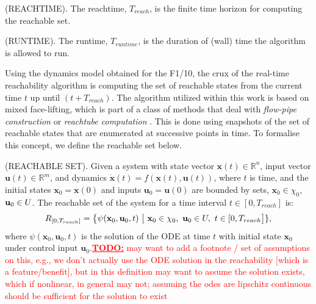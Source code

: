 \documentclass[manuscript,screen,review]{acmart}
\newcommand{\todo}[1]{\textcolor{red}{\textbf{\underline{TODO:}} #1}}
\begin{document}
\begin{definition}%
(REACHTIME). The reachtime, $T_{reach}$, is the finite time horizon for computing the reachable set.
\end{definition}%
\begin{definition}%
(RUNTIME). The runtime, $T_{runtime}$, is the duration of (wall) time the algorithm is allowed to run.
\end{definition}%
 Using the dynamics model obtained for the F1/10, the crux of the real-time reachability algorithm is computing the set of reachable states from the current time $t$ up until $(t+T_{reach})$. The algorithm utilized within this work is based on mixed face-lifting, which is part of a class of methods that deal with \textit{flow-pipe construction} or \textit{reachtube computation} \cite{Johnson2016}. This is done using snapshots of the set of reachable states that are enumerated at successive points in time. To formalise this concept, we define the reachable set below.
\smallskip
\begin{definition}%
(REACHABLE SET). Given a system with state vector $\textbf{x}(t) \in \mathbb{R}^n$, input vector $\textbf{u}(t) \in \mathbb{R}^m$, and dynamics $\dot{\textbf{x}}(t)=f(\textbf{x}(t),\textbf{u}(t))$, where $t$ is time, and the initial states $\textbf{x}_0 = \textbf{x}(0)$ and inputs $\textbf{u}_0 = \textbf{u}(0)$ are bounded by sets, $\textbf{x}_0 \in \chi_0$, $\textbf{u}_0 \in \mathnormal{U}$. The reachable set of the system for a time interval $ t \in [0,T_{reach}]$ is:%
%
\begin{equation*}%
    \mathnormal{R}_{[0,T_{reach}]} = \big \{ \psi(\textbf{x}_0,\textbf{u}_0,t) \ \big| \ \textbf{x}_0 \in \chi_0, \ \textbf{u}_0 \in \mathnormal{U}, \ t \in [0,T_{reach}\big]\},%
\end{equation*}%
%
\noindent where $\psi(\textbf{x}_0,\textbf{u}_0,t)$ is the solution of the ODE at time $t$ with initial state $\textbf{x}_0$ under control input $\textbf{u}_0$.\todo{may want to add a footnote / set of assumptions on this, e.g., we don't actually use the ODE solution in the reachability [which is a feature/benefit], but in this definition may want to assume the solution exists, which if nonlinear, in general may not; assuming the odes are lipschitz continuous should be sufficient for the solution to exist}
\end{definition}%
\smallskip
\end{document}
